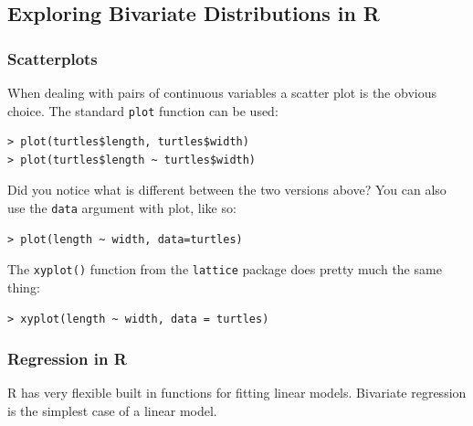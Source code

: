 \documentclass{article}
\begin{document}
\subsection{Exploring Bivariate Distributions in R}

\subsubsection{Scatterplots}

When dealing with pairs of continuous variables a scatter plot is the
obvious choice. The standard \lstinline!plot! function can be used:

\begin{lstlisting}
> plot(turtles$length, turtles$width)
> plot(turtles$length ~ turtles$width)    
\end{lstlisting}
Did you notice what is different between the two versions above? You can
also use the \lstinline!data! argument with plot, like so:

\begin{lstlisting}
> plot(length ~ width, data=turtles)
\end{lstlisting}
The \lstinline!xyplot()! function from the \lstinline!lattice! package
does pretty much the same thing:

\begin{lstlisting}
> xyplot(length ~ width, data = turtles)
\end{lstlisting}
\subsubsection{Regression in R}

R has very flexible built in functions for fitting linear models.
Bivariate regression is the simplest case of a linear model.
\end{document}
